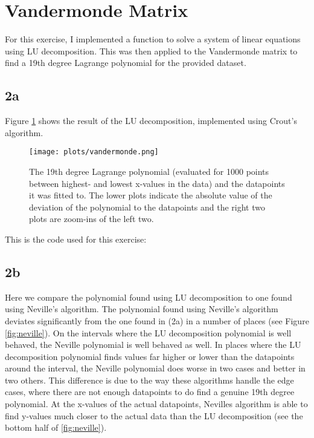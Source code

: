 \newpage
\section{Vandermonde Matrix}
For this exercise, I implemented a function to solve a system of linear equations
using LU decomposition. This was then applied to the Vandermonde matrix to
find a 19th degree Lagrange polynomial for the provided dataset.

\subsection*{2a}
Figure \ref{fig:vandermonde} shows the result of the LU decomposition, implemented using Crout's algorithm.
\begin{figure}
    \centering
    \texttt{[image: plots/vandermonde.png]}
    \caption{The 19th degree Lagrange polynomial (evaluated for 1000 points 
    between highest- and lowest x-values in the data) and the datapoints it 
    was fitted to. The lower plots indicate the absolute value of the 
    deviation of the polynomial to the datapoints and the right two plots are zoom-ins of the left two.}
    \label{fig:vandermonde}
\end{figure}

\noindent
This is the code used for this exercise:


\subsection*{2b}
Here we compare the polynomial found using LU decomposition to one found using Neville's algorithm.
The polynomial found using Neville's algorithm deviates significantly
from the one found in (2a) in a number of places (see Figure \ref{fig:neville}). 
On the intervals where the LU decomposition polynomial is well behaved, the 
Neville polynomial is well behaved as well. In places where the LU 
decomposition polynomial finds values far higher or lower than the 
datapoints around the interval, the Neville polynomial does worse in two 
cases and better in two others. This difference is due to the way these 
algorithms handle the edge cases, where there are not enough datapoints to 
do find a genuine 19th degree polynomial.
At the x-values of the actual datapoints, Nevilles algorithm is able to find y-values much closer to the actual data 
than the LU decomposition (see the bottom half of \ref{fig:neville}).

